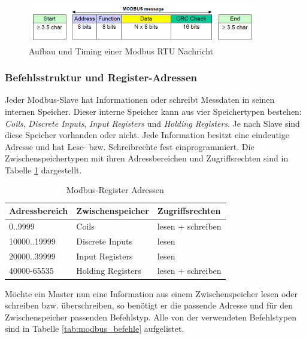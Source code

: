 \begin{figure}[htb]
\centering		\includegraphics[width=0.90\textwidth]{Pictures/Versuchsaufbau/Modbus_Frame.png}
\caption{Aufbau und Timing einer Modbus RTU Nachricht \citep{MODBUS.ORG2002}}
\label{fig:}
\end{figure}

\subsubsection*{Befehlsstruktur und Register-Adressen}

Jeder Modbus-Slave hat Informationen oder schreibt Messdaten in seinen internen Speicher. Dieser interne Speicher kann aus vier Speichertypen bestehen: \textit{Coils}, \textit{Discrete Inputs}, \textit{Input Registers} und \textit{Holding Registers}. Je nach Slave sind diese Speicher vorhanden oder nicht. Jede Information besitzt eine eindeutige Adresse und hat Lese- bzw. Schreibrechte fest einprogrammiert. Die Zwischenspeichertypen mit ihren Adressbereichen und Zugriffsrechten sind in Tabelle \ref{tab:modbus_registers} dargestellt. 

\begin{table}[htb]
\centering
\caption{Modbus-Register Adressen \citep{KMGH2013}}
\begin{tabular}{lll}
\hline 
\textbf{Adressbereich} & \textbf{Zwischenspeicher} & \textbf{Zugriffsrechten} \\ 
\hline 
\hline 
0..9999 & Coils & lesen + schreiben \\ 
\hline 
10000..19999 & Discrete Inputs & lesen \\ 
\hline 
20000..39999 & Input Registers & lesen \\ 
\hline 
40000-65535 & Holding Registers & lesen + schreiben \\ 
\hline 
\hline 
\end{tabular} 
\label{tab:modbus_registers}
\end{table}

 Möchte ein Master nun eine Information aus einem Zwischenspeicher lesen oder schreiben bzw. überschreiben, so benötigt er die passende Adresse und für den Zwischenspeicher passenden Befehlstyp. Alle von der \textsc{\citeauthor{MODBUS.ORG2002}} verwendeten Befehlstypen sind in Tabelle \ref{tab:modbus_befehle} aufgelistet. 

